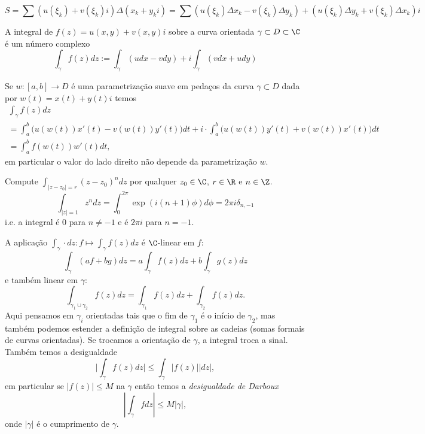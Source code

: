 $$ S = \sum (u(\xi_k)+v(\xi_k)i) \Delta (x_k + y_k i) 
= \sum (u(\xi_k) \Delta x_k - v(\xi_k) \Delta y_k) + (u(\xi_k) \Delta y_k + v(\xi_k) \Delta x_k)i $$

\begin{defin}
A integral de $f(z) = u(x,y) + v(x,y) i$ sobre a curva orientada $\gamma \subset D \subset \C$ é um número complexo
\[ \int_\gamma f(z) dz := \int_\gamma (u dx - v dy) + i \int_\gamma (v dx + u dy) \]
\end{defin}

Se $w: [a,b] \to D$ é uma parametrização suave em pedaços da curva $\gamma \subset D$
dada por $w(t) = x(t) + y(t) i$ temos
\begin{multline}
\int_\gamma f(z) dz \\ 
  =       \int_a^b \big( u(w(t)) x'(t) - v(w(t)) y'(t) \big) dt 
+ i \cdot \int_a^b \big( u(w(t)) y'(t) + v(w(t)) x'(t) \big) dt
\\ = \int_a^b f(w(t)) w'(t) dt,
\end{multline}
em particular o valor do lado direito não depende da parametrização $w$.

\begin{exem}
Compute $\int_{|z-z_0|=r} (z-z_0)^n dz$ por qualquer $z_0\in\C$, $r\in\R$ e $n \in \Z$.
$$ \int_{|z|=1} z^n dz = \int_0^{2\pi} \exp(i(n+1)\phi) d\phi = 2\pi i \delta_{n,-1} $$
i.e. a integral é $0$ para $n\neq -1$ e é $2\pi i$ para $n=-1$.
\end{exem}

\begin{teorema}
A aplicação $\int_\gamma \cdot dz : f \mapsto \int_\gamma f(z) dz$ é $\C$-linear em $f$:
$$ \int_\gamma (a f + b g) dz = a \int_\gamma f(z) dz + b \int_\gamma g(z) dz $$
e também linear em $\gamma$:
$$ \int_{\gamma_1 \cup \gamma_2} f(z) dz = \int_{\gamma_1} f(z) dz + \int_{\gamma_2} f(z) dz.$$
Aqui pensamos em $\gamma_i$ orientadas tais que o fim de $\gamma_1$ é o início de $\gamma_2$,
mas também podemos estender a definição de integral sobre as cadeias (somas formais de curvas orientadas).
Se trocamos a orientação de $\gamma$, a integral troca a sinal.
Também temos a desigualdade
\[ \big|\int_\gamma f(z) dz\big| \leq \int_\gamma |f(z)| |dz|, \]
em particular se $|f(z)|\leq M$ na $\gamma$ então temos a \emph{desigualdade de Darboux}
\begin{equation}
\label{eq:darboux}
|\int_\gamma f dz| \leq M |\gamma|,
\end{equation}
onde $|\gamma|$ é o cumprimento de $\gamma$.
\end{teorema}

